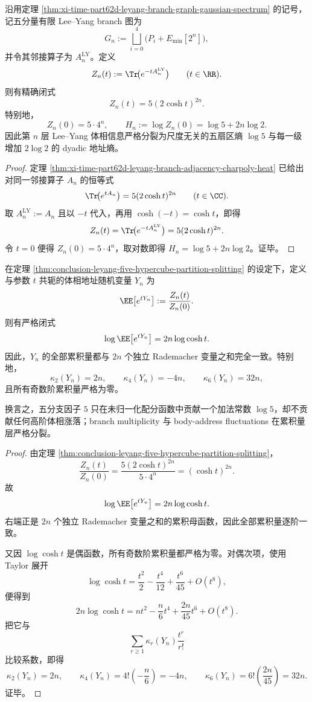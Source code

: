 \begin{theorem}\label{thm:conclusion-leyang-five-hypercube-partition-splitting}
沿用定理 \ref{thm:xi-time-part62d-leyang-branch-graph-gaussian-spectrum} 的记号，记五分量有限 Lee--Yang branch 图为
\[
G_n:=\bigsqcup_{i=0}^{4}\bigl(P_i+E_{\min}[2^n]\bigr),
\]
并令其邻接算子为 \(A_n^{\mathrm{LY}}\)。定义
\[
Z_n(t):=\Tr\!\bigl(e^{-tA_n^{\mathrm{LY}}}\bigr)
\qquad (t\in\RR).
\]
则有精确闭式
\[
Z_n(t)=5(2\cosh t)^{2n}.
\]
特别地，
\[
Z_n(0)=5\cdot 4^n,
\qquad
H_n:=\log Z_n(0)=\log 5+2n\log 2.
\]
因此第 \(n\) 层 Lee--Yang 体相信息严格分裂为尺度无关的五扇区熵 \(\log 5\) 与每一级增加 \(2\log 2\) 的 dyadic 地址熵。
\end{theorem}
\begin{proof}
定理 \ref{thm:xi-time-part62d-leyang-branch-adjacency-charpoly-heat} 已给出对同一邻接算子 \(A_n\) 的恒等式
\[
\Tr\!\bigl(e^{tA_n}\bigr)=5(2\cosh t)^{2n}
\qquad (t\in\CC).
\]
取 \(A_n^{\mathrm{LY}}:=A_n\) 且以 \(-t\) 代入，再用 \(\cosh(-t)=\cosh t\)，即得
\[
Z_n(t)=\Tr\!\bigl(e^{-tA_n^{\mathrm{LY}}}\bigr)=5(2\cosh t)^{2n}.
\]
令 \(t=0\) 便得 \(Z_n(0)=5\cdot 4^n\)，取对数即得 \(H_n=\log 5+2n\log 2\)。证毕。
\end{proof}

\begin{theorem}\label{thm:conclusion-leyang-five-branch-body-address-rademacher-cumulants}
在定理 \ref{thm:conclusion-leyang-five-hypercube-partition-splitting} 的设定下，定义与参数 \(t\) 共轭的体相地址随机变量 \(Y_n\) 为
\[
\EE\!\left[e^{tY_n}\right]
:=
\frac{Z_n(t)}{Z_n(0)}.
\]
则有严格闭式
\[
\log \EE\!\left[e^{tY_n}\right]=2n\log\cosh t.
\]
因此，\(Y_n\) 的全部累积量都与 \(2n\) 个独立 Rademacher 变量之和完全一致。特别地，
\[
\kappa_2(Y_n)=2n,\qquad
\kappa_4(Y_n)=-4n,\qquad
\kappa_6(Y_n)=32n,
\]
且所有奇数阶累积量严格为零。

换言之，五分支因子 \(5\) 只在未归一化配分函数中贡献一个加法常数 \(\log 5\)，却不贡献任何高阶体相涨落；branch multiplicity 与 body-address fluctuations 在累积量层严格分裂。
\end{theorem}
\begin{proof}
由定理 \ref{thm:conclusion-leyang-five-hypercube-partition-splitting}，
\[
\frac{Z_n(t)}{Z_n(0)}
=
\frac{5(2\cosh t)^{2n}}{5\cdot 4^n}
=
(\cosh t)^{2n}.
\]
故
\[
\log \EE\!\left[e^{tY_n}\right]=2n\log\cosh t.
\]
右端正是 \(2n\) 个独立 Rademacher 变量之和的累积母函数，因此全部累积量逐阶一致。

又因 \(\log\cosh t\) 是偶函数，所有奇数阶累积量都严格为零。对偶次项，使用 Taylor 展开
\[
\log\cosh t
=
\frac{t^2}{2}-\frac{t^4}{12}+\frac{t^6}{45}+O(t^8),
\]
便得到
\[
2n\log\cosh t
=
n t^2-\frac{n}{6}t^4+\frac{2n}{45}t^6+O(t^8).
\]
把它与
\[
\sum_{r\ge 1}\kappa_r(Y_n)\frac{t^r}{r!}
\]
比较系数，即得
\[
\kappa_2(Y_n)=2n,\qquad
\kappa_4(Y_n)=4!\left(-\frac{n}{6}\right)=-4n,
\qquad
\kappa_6(Y_n)=6!\left(\frac{2n}{45}\right)=32n.
\]
证毕。
\end{proof}

